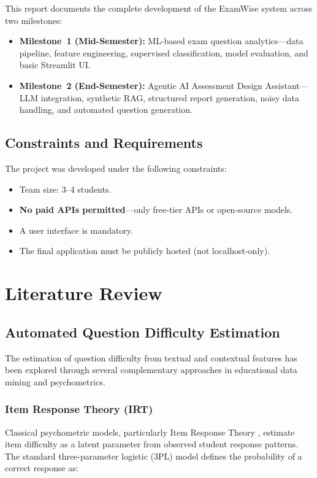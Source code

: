 \documentclass[12pt, a4paper]{article}
\begin{document}
This report documents the complete development of the ExamWise system across two milestones:

\begin{itemize}
    \item \textbf{Milestone~1 (Mid-Semester):} ML-based exam question analytics---data pipeline, feature engineering, supervised classification, model evaluation, and basic Streamlit UI.
    \item \textbf{Milestone~2 (End-Semester):} Agentic AI Assessment Design Assistant---LLM integration, synthetic RAG, structured report generation, noisy data handling, and automated question generation.
\end{itemize}

\subsection{Constraints and Requirements}

The project was developed under the following constraints:
\begin{itemize}[noitemsep]
    \item Team size: 3--4 students.
    \item \textbf{No paid APIs permitted}---only free-tier APIs or open-source models.
    \item A user interface is mandatory.
    \item The final application must be publicly hosted (not localhost-only).
\end{itemize}

\section{Literature Review}
\label{sec:litreview}

\subsection{Automated Question Difficulty Estimation}

The estimation of question difficulty from textual and contextual features has been explored through several complementary approaches in educational data mining and psychometrics.

\subsubsection{Item Response Theory (IRT)}
Classical psychometric models, particularly Item Response Theory \citep{hambleton1991fundamentals}, estimate item difficulty as a latent parameter from observed student response patterns. The standard three-parameter logistic (3PL) model defines the probability of a correct response as:
\end{document}
